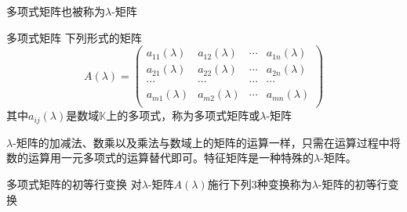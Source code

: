 多项式矩阵也被称为$\lambda$-矩阵

\begin{definition}{多项式矩阵}
下列形式的矩阵
$$A(\lambda)=\begin{pmatrix}
a_{11}(\lambda) & a_{12}(\lambda) & \cdots & a_{1n}(\lambda) \\
a_{21}(\lambda) & a_{22}(\lambda) & \cdots & a_{2n}(\lambda) \\
\cdots          & \cdots          & \cdots & \cdots          \\
a_{m1}(\lambda) & a_{m2}(\lambda) & \cdots & a_{mn}(\lambda) \\
\end{pmatrix}$$
其中$a_{ij}(\lambda)$是数域$\mathbb{K}$上的多项式，称为多项式矩阵或$\lambda$-矩阵
\end{definition}


$\lambda$-矩阵的加减法、数乘以及乘法与数域上的矩阵的运算一样，只需在运算过程中将数的运算用一元多项式的运算替代即可。特征矩阵是一种特殊的$\lambda$-矩阵。

\begin{definition}{多项式矩阵的初等行变换}
对$\lambda$-矩阵$A(\lambda)$施行下列3种变换称为$\lambda$-矩阵的初等行变换
\end{definition}

